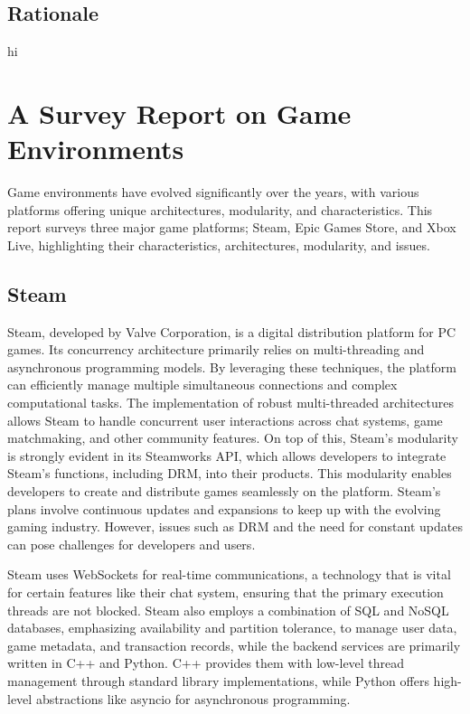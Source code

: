 \documentclass[]{final}
\begin{document}
\section{Rationale}
hi

\chapter{A Survey Report on Game Environments}

Game environments have evolved significantly over the years, with various platforms
offering unique architectures, modularity, and characteristics. This report surveys
three major game platforms; Steam, Epic Games Store, and Xbox Live, highlighting
their characteristics, architectures, modularity, and issues.

\section{Steam}
Steam, developed by Valve Corporation, is a digital distribution platform
for PC games. Its concurrency architecture primarily relies on multi-threading and asynchronous
programming models. By leveraging these techniques, the platform can efficiently manage
multiple simultaneous connections and complex computational tasks. The implementation
of robust multi-threaded architectures allows Steam to handle concurrent user interactions
across chat systems, game matchmaking, and other community features. On top of this,
Steam's modularity is strongly evident in its Steamworks API, which allows developers to
integrate Steam's functions, including DRM, into their products.\cite{simmons_decoding_2023, noauthor_steamworks_nodate}
This modularity enables developers to create and distribute games seamlessly on the platform.
Steam's plans involve continuous updates and expansions to keep up with
the evolving gaming industry.\cite{noauthor_steam_nodate1} However, issues such as DRM and the need for
constant updates can pose challenges for developers and users\cite{noauthor_steam_nodate}.

Steam uses WebSockets for real-time communications, a technology that is vital
for certain features like their chat system, ensuring that the primary execution threads are not blocked.\cite{noauthor_isteamnetworkingsockets_nodate}
Steam also employs a combination of SQL and NoSQL databases\cite{simmons_decoding_2023, djundik_how_2017}, emphasizing availability
and partition tolerance, to manage user data, game metadata, and transaction records, while
the backend services are primarily written in C++ and Python.\cite{simmons_decoding_2023}  C++ provides them with low-level thread management through standard
library implementations, while Python offers high-level abstractions like asyncio
for asynchronous programming.
\end{document}
